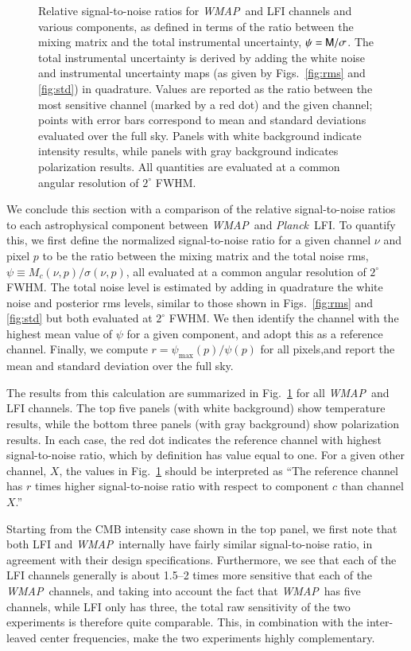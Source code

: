\documentclass[twocolumn]{../../common/aa}
\def\WMAP{\emph{WMAP}}
\def\Planck{\emph{Planck}}
\newcommand{\M}[0]{\tens{M}}
\begin{document}
\begin{figure}
  \caption{Relative signal-to-noise ratios for \WMAP\ and LFI channels and various components, as defined in terms of the ratio between the mixing matrix and the total instrumental uncertainty, $\psi = \M/\sigma$. The total instrumental uncertainty is derived by adding the white noise and instrumental uncertainty maps (as given by Figs.~\ref{fig:rms} and \ref{fig:std}) in quadrature. Values are reported as the ratio between the most sensitive channel (marked by a red dot) and the given channel; points with error bars correspond to mean and standard deviations evaluated over the full sky. Panels with white background indicate intensity results, while panels with gray background indicates polarization results. All quantities are evaluated at a common angular resolution of $2^{\circ}$ FWHM.}
  \label{fig:fg_s2n}
\end{figure}

We conclude this section with a comparison of the relative signal-to-noise ratios to each astrophysical component between \WMAP\ and \Planck\ LFI. To quantify this, we first define the normalized signal-to-noise ratio for a given channel $\nu$ and pixel $p$ to be the ratio between the mixing matrix and the total noise rms,  $\psi \equiv M_{c}(\nu, p)/\sigma(\nu, p)$, all evaluated at a common angular resolution of $2^{\circ}$ FWHM. The total noise level is estimated by adding in quadrature the white noise and posterior rms levels, similar to those shown in Figs.~\ref{fig:rms} and \ref{fig:std} but both evaluated at $2^{\circ}$ FWHM. 
We then identify the channel with the highest mean value of $\psi$ for a given component, and adopt this as a reference channel. Finally, we compute $r=\psi_{\mathrm{max}}(p)/\psi(p)$ for all pixels,and report the mean and standard deviation over the full sky.

The results from this calculation are summarized in Fig.~\ref{fig:fg_s2n} for all \WMAP\ and LFI channels. The top five panels (with white background) show temperature results, while the bottom three panels (with gray background) show polarization results. In each case, the red dot indicates the reference channel with highest signal-to-noise ratio, which by definition has value equal to one. For a given other channel, $X$, the values in Fig.~\ref{fig:fg_s2n} should be interpreted as ``The reference channel has $r$ times higher signal-to-noise ratio with respect to component $c$ than channel $X$.''

Starting from the CMB intensity case shown in the top panel, we first note that both LFI and \WMAP\ internally have fairly similar signal-to-noise ratio, in agreement with their design specifications. Furthermore, we see that each of the LFI channels generally is about 1.5--2 times more sensitive that each of the \WMAP\ channels, and taking into account the fact that \WMAP\ has five channels, while LFI only has three, the total raw sensitivity of the two experiments is therefore quite comparable. This, in combination with the inter-leaved center frequencies, make the two experiments highly complementary.
\end{document}
